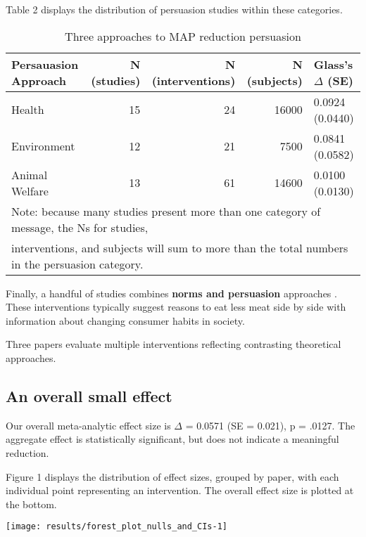 \documentclass[sn-nature,pdflatex]{sn-jnl}
\begin{document}
Table 2 displays the distribution of persuasion studies within these
categories.

\begin{table}[!h]
\centering
\caption{\label{tab:tab:table_two}Three approaches to MAP reduction persuasion}
\centering
\begin{tabular}[t]{lrrrl}
\toprule
Persauasion Approach & N (studies) & N (interventions) & N (subjects) & Glass's $\Delta$ (SE)\\
\midrule
Health & 15 & 24 & 16000 & 0.0924 (0.0440)\\
Environment & 12 & 21 & 7500 & 0.0841 (0.0582)\\
Animal Welfare & 13 & 61 & 14600 & 0.0100 (0.0130)\\
\bottomrule
\multicolumn{5}{l}{\textsuperscript{} Note: because many studies present more than one category of message, the Ns for studies, \linebreak}\\
\multicolumn{5}{l}{interventions, and subjects will sum to more than the total numbers in the persuasion category.}\\
\end{tabular}
\end{table}

Finally, a handful of studies combines \textbf{norms and persuasion}
approaches \citep{hennessy2016, carfora2023, mattson2020, piester2020}.
These interventions typically suggest reasons to eat less meat side by
side with information about changing consumer habits in society.

Three papers \citep{piester2020, hennessy2016, kanchanachitra2020}
evaluate multiple interventions reflecting contrasting theoretical
approaches.

\subsection{An overall small effect}\label{sec2.2}

Our overall meta-analytic effect size is \(\Delta\) = 0.0571 (SE =
0.021), p = .0127. The aggregate effect is statistically significant,
but does not indicate a meaningful reduction.

Figure 1 displays the distribution of effect sizes, grouped by paper,
with each individual point representing an intervention. The overall
effect size is plotted at the bottom.

\texttt{[image: results/forest\_plot\_nulls\_and\_CIs-1]}
\end{document}
